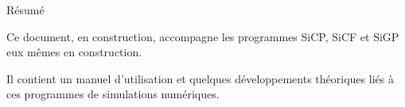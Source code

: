 \begin{center}

Résumé

\end{center}

Ce document, en construction, accompagne les programmes SiCP, SiCF et SiGP eux mêmes en construction.

Il contient un manuel d'utilisation et quelques développements théoriques liés à ces programmes de simulations numériques.

